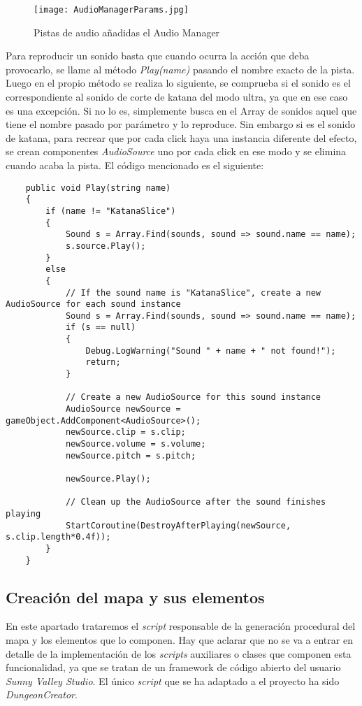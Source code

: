 \begin{figure}[H]
    \centering
    \texttt{[image: AudioManagerParams.jpg]}
    \caption{Pistas de audio añadidas el Audio Manager}
\end{figure}

Para reproducir un sonido basta que cuando ocurra la acción que deba provocarlo, se llame al método \textit{Play(name)} pasando el nombre exacto de la pista. Luego en el propio método se realiza lo siguiente, se comprueba si el sonido es el correspondiente al sonido de corte de katana del modo ultra, ya que en ese caso es una excepción. Si no lo es, simplemente busca en el Array de sonidos aquel que tiene el nombre pasado por parámetro y lo reproduce. Sin embargo si es el sonido de katana, para recrear que por cada click haya una instancia diferente del efecto, se crean componentes \textit{AudioSource} uno por cada click en ese modo y se elimina cuando acaba la pista. El código mencionado es el siguiente: 

\begin{lstlisting}
    public void Play(string name)
    {
        if (name != "KatanaSlice")
        {
            Sound s = Array.Find(sounds, sound => sound.name == name);
            s.source.Play();
        }
        else
        {
            // If the sound name is "KatanaSlice", create a new AudioSource for each sound instance
            Sound s = Array.Find(sounds, sound => sound.name == name);
            if (s == null)
            {
                Debug.LogWarning("Sound " + name + " not found!");
                return;
            }

            // Create a new AudioSource for this sound instance
            AudioSource newSource = gameObject.AddComponent<AudioSource>();
            newSource.clip = s.clip;
            newSource.volume = s.volume;
            newSource.pitch = s.pitch;

            newSource.Play();

            // Clean up the AudioSource after the sound finishes playing
            StartCoroutine(DestroyAfterPlaying(newSource, s.clip.length*0.4f));
        }
    }
\end{lstlisting}

\subsection{Creación del mapa y sus elementos}
\label{subsec:mapaYelementos}

En este apartado trataremos el \textit{script} responsable de la generación procedural del mapa y los elementos que lo componen. Hay que aclarar que no se va a entrar en detalle de la implementación de los \textit{scripts} auxiliares o clases que componen esta funcionalidad, ya que se tratan de un framework de código abierto del usuario \textit{Sunny Valley Studio}. El único \textit{script} que se ha adaptado a el proyecto ha sido \textit{DungeonCreator}.

